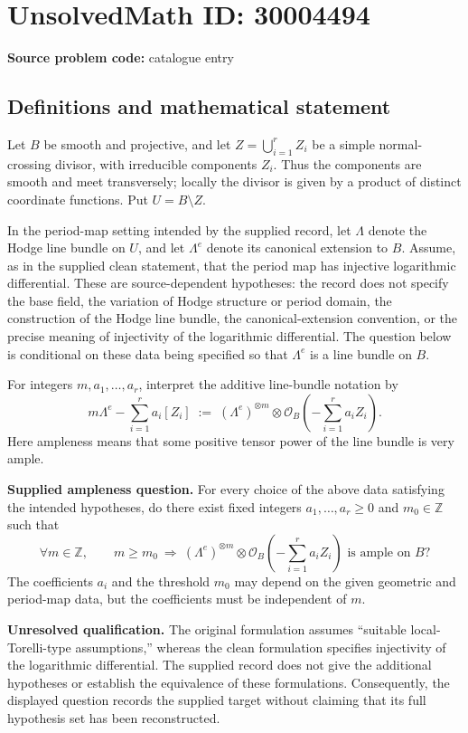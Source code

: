 \documentclass[11pt]{article}
\newcommand{\Z}{\mathbb{Z}}
\begin{document}
\section*{UnsolvedMath ID: 30004494}
\textbf{Source problem code:} catalogue entry
\subsection{Definitions and mathematical statement}
Let \(B\) be smooth and projective, and let \(Z=\bigcup_{i=1}^{r}Z_i\) be a simple normal-crossing divisor, with irreducible components \(Z_i\). Thus the components are smooth and meet transversely; locally the divisor is given by a product of distinct coordinate functions. Put \(U=B\setminus Z\).

In the period-map setting intended by the supplied record, let \(\Lambda\) denote the Hodge line bundle on \(U\), and let \(\Lambda^e\) denote its canonical extension to \(B\). Assume, as in the supplied clean statement, that the period map has injective logarithmic differential. These are source-dependent hypotheses: the record does not specify the base field, the variation of Hodge structure or period domain, the construction of the Hodge line bundle, the canonical-extension convention, or the precise meaning of injectivity of the logarithmic differential. The question below is conditional on these data being specified so that \(\Lambda^e\) is a line bundle on \(B\).

For integers \(m,a_1,\ldots,a_r\), interpret the additive line-bundle notation by
\[
 m\Lambda^e-\sum_{i=1}^{r}a_i[Z_i]
 \;:=\;
 (\Lambda^e)^{\otimes m}\otimes
 \mathcal O_B\!\left(-\sum_{i=1}^{r}a_iZ_i\right).
\]
Here ampleness means that some positive tensor power of the line bundle is very ample.

\textbf{Supplied ampleness question.} For every choice of the above data satisfying the intended hypotheses, do there exist fixed integers \(a_1,\ldots,a_r\geq 0\) and \(m_0\in\Z\) such that
\[
 \forall m\in\Z,\qquad
 m\geq m_0\ \Longrightarrow\
 (\Lambda^e)^{\otimes m}\otimes
 \mathcal O_B\!\left(-\sum_{i=1}^{r}a_iZ_i\right)
 \text{ is ample on }B?
\]
The coefficients \(a_i\) and the threshold \(m_0\) may depend on the given geometric and period-map data, but the coefficients must be independent of \(m\).

\textbf{Unresolved qualification.} The original formulation assumes ``suitable local-Torelli-type assumptions,'' whereas the clean formulation specifies injectivity of the logarithmic differential. The supplied record does not give the additional hypotheses or establish the equivalence of these formulations. Consequently, the displayed question records the supplied target without claiming that its full hypothesis set has been reconstructed.
\end{document}
